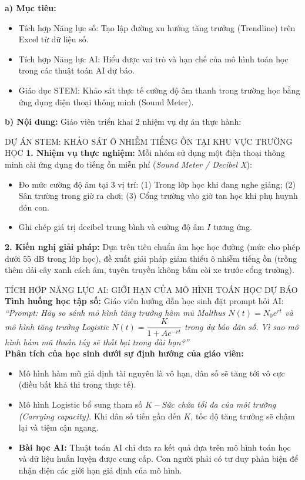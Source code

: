 \documentclass[12pt, a4paper]{article}
\begin{document}
\noindent \textbf{a) Mục tiêu:}
\begin{itemize}[leftmargin=0.6cm]
    \item Tích hợp Năng lực số: Tạo lập đường xu hướng tăng trưởng (Trendline) trên Excel từ dữ liệu số.
    \item Tích hợp Năng lực AI: Hiểu được vai trò và hạn chế của mô hình toán học trong các thuật toán AI dự báo.
    \item Giáo dục STEM: Khảo sát thực tế cường độ âm thanh trong trường học bằng ứng dụng điện thoại thông minh (Sound Meter).
\end{itemize}

\noindent \textbf{b) Nội dung:}
Giáo viên triển khai 2 nhiệm vụ dự án thực hành:

\begin{stembox}{DỰ ÁN STEM: KHẢO SÁT Ô NHIỄM TIẾNG ỒN TẠI KHU VỰC TRƯỜNG HỌC}
\textbf{1. Nhiệm vụ thực nghiệm:} Mỗi nhóm sử dụng một điện thoại thông minh cài ứng dụng đo tiếng ồn miễn phí (\textit{Sound Meter / Decibel X}):
\begin{itemize}
    \item Đo mức cường độ âm tại 3 vị trí: (1) Trong lớp học khi đang nghe giảng; (2) Sân trường trong giờ ra chơi; (3) Cổng trường vào giờ tan học khi phụ huynh đón con.
    \item Ghi chép giá trị decibel trung bình và cường độ âm $I$ tương ứng.
\end{itemize}
\textbf{2. Kiến nghị giải pháp:} Dựa trên tiêu chuẩn âm học học đường (mức cho phép dưới $55\text{ dB}$ trong lớp học), đề xuất giải pháp giảm thiểu ô nhiễm tiếng ồn (trồng thêm dải cây xanh cách âm, tuyên truyền không bấm còi xe trước cổng trường).
\end{stembox}

\begin{aibox}{TÍCH HỢP NĂNG LỰC AI: GIỚI HẠN CỦA MÔ HÌNH TOÁN HỌC DỰ BÁO}
\textbf{Tình huống học tập số:} Giáo viên hướng dẫn học sinh đặt prompt hỏi AI:\\
\textit{``Prompt: Hãy so sánh mô hình tăng trưởng hàm mũ Malthus $N(t) = N_0 e^{rt}$ và mô hình tăng trưởng Logistic $N(t) = \dfrac{K}{1 + A e^{-rt}}$ trong dự báo dân số. Vì sao mô hình hàm mũ thuần túy sẽ thất bại trong dài hạn?''}\\
\textbf{Phân tích của học sinh dưới sự định hướng của giáo viên:}
\begin{itemize}
    \item Mô hình hàm mũ giả định tài nguyên là vô hạn, dân số sẽ tăng tới vô cực (điều bất khả thi trong thực tế).
    \item Mô hình Logistic bổ sung tham số $K$ -- \textit{Sức chứa tối đa của môi trường (Carrying capacity)}. Khi dân số tiến gần đến $K$, tốc độ tăng trưởng sẽ chậm lại và tiệm cận ngang.
    \item \textbf{Bài học AI:} Thuật toán AI chỉ đưa ra kết quả dựa trên mô hình toán học và dữ liệu huấn luyện được cung cấp. Con người phải có tư duy phản biện để nhận diện các giới hạn giả định của mô hình.
\end{itemize}
\end{aibox}
\end{document}
